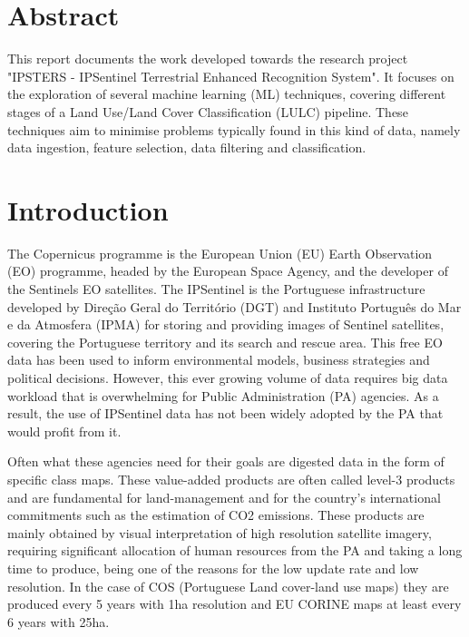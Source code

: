 \documentclass[12pt, english, openany]{book}
\begin{document}
\chapter*{Abstract}

This report documents the work developed towards the research
project "IPSTERS - IPSentinel Terrestrial Enhanced Recognition System". It
focuses on the exploration of several machine learning (ML) techniques,
covering different stages of a Land Use/Land Cover Classification (LULC)
pipeline. These techniques aim to minimise problems typically found in this
kind of data, namely data ingestion, feature selection, data filtering and
classification.

\tableofcontents{}

\clearpage

\listoffigures

\clearpage

\listoftables

\mainmatter

\chapter{Introduction}

The Copernicus programme is the European Union (EU) Earth Observation (EO)
programme, headed by the European Space Agency, and the developer of the
Sentinels EO satellites. The IPSentinel is the Portuguese infrastructure
developed by Direção Geral do Território (DGT) and Instituto Português do Mar e
da Atmosfera (IPMA) for storing and providing images of Sentinel satellites,
covering the Portuguese territory and its search and rescue area. This free EO
data has been used to inform environmental models, business strategies and
political decisions. However, this ever growing volume of data requires big
data workload that is overwhelming for Public Administration (PA) agencies. As
a result, the use of IPSentinel data has not been widely adopted by the PA that
would profit from it.

Often what these agencies need for their goals are digested data in the form of
specific class maps. These value-added products are often called level-3
products and are fundamental for land-management and for the country's
international commitments such as the estimation of CO2 emissions. These
products are mainly obtained by visual interpretation of high resolution
satellite imagery, requiring significant allocation of human resources from the
PA and taking a long time to produce, being one of the reasons for the low
update rate and low resolution. In the case of COS (Portuguese Land cover-land
use maps) they are produced every 5 years with 1ha resolution and EU CORINE
maps at least every 6 years with 25ha.
\end{document}
